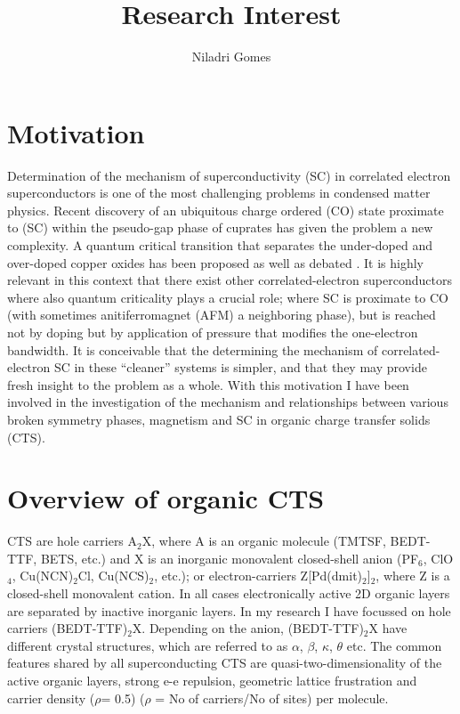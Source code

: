 \documentclass[a4paper,11pt]{article}
\title{\vspace{-2cm}Research Interest}
\author{Niladri Gomes}
\begin{document}
\maketitle



\section{Motivation}
Determination of the mechanism of superconductivity (SC) in correlated electron superconductors is one of the most challenging 
problems in condensed matter physics. Recent discovery of an ubiquitous charge ordered (CO) state proximate to (SC) within the 
pseudo-gap phase of cuprates \cite{comin14a} has given the problem a new complexity. A quantum critical
transition that separates the under-doped and over-doped copper oxides has been proposed as well as debated \cite{scalapino12a}. It is highly relevant in this context that there exist
other correlated-electron superconductors where also quantum criticality plays a crucial role; where SC is
proximate to CO (with sometimes anitiferromagnet (AFM) a neighboring phase), but is reached not by doping but by application
of pressure that modifies the one-electron bandwidth. It is conceivable that the
determining the mechanism of correlated-electron SC in these “cleaner” systems is simpler,
and that they may provide fresh insight to the problem as a whole. With this motivation I have 
been involved in the investigation of the mechanism and relationships between various broken symmetry phases, 
magnetism and SC in organic charge transfer solids (CTS).  

\section{Overview of organic CTS}
CTS are hole carriers A$_{2}$X, where A is an organic molecule (TMTSF, BEDT-TTF, BETS, etc.) and X is
an inorganic monovalent closed-shell anion (PF$_{6}$, ClO$_{4}$, Cu(NCN)$_{2}$Cl, Cu(NCS)$_{2}$, etc.); or electron-carriers
Z[Pd(dmit)$_{2}$]$_{2}$, where Z is a closed-shell monovalent cation. In all cases electronically active 2D organic
layers are separated by inactive inorganic layers. In my research I have focussed on hole carriers (BEDT-TTF)$_{2}$X. Depending
on the anion, (BEDT-TTF)$_{2}$X have different crystal structures, which are referred to as $\alpha$, $\beta$, $\kappa$, $\theta$ etc. 
The common features shared by all superconducting CTS are quasi-two-dimensionality of
the active organic layers, strong e-e repulsion, geometric lattice frustration and carrier density ($\rho$= 0.5) ($\rho$ = No of carriers/No of sites)
 per molecule.
\end{document}
